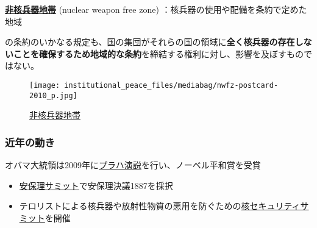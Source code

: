 \documentclass[
  xelatex,
  ja=standard]{bxjsarticle}
\providecommand{\tightlist}{%
  \setlength{\itemsep}{0pt}\setlength{\parskip}{0pt}}\usepackage{longtable,booktabs,array}
\begin{document}
\href{https://www.un.org/disarmament/wmd/nuclear/nwfz/}{\textbf{非核兵器地帯}}
(nuclear weapon free zone) ：核兵器の使用や配備を条約で定めた地域

\begin{tcolorbox}[enhanced jigsaw, opacityback=0, bottomtitle=1mm, arc=.35mm, opacitybacktitle=0.6, title=\textcolor{quarto-callout-note-color}{\faInfo}\hspace{0.5em}{\href{https://www1.doshisha.ac.jp/~karai/intlaw/docs/npt.htm}{核兵器不拡散条約}　第7条}, bottomrule=.15mm, coltitle=black, toptitle=1mm, titlerule=0mm, leftrule=.75mm, colframe=quarto-callout-note-color-frame, breakable, left=2mm, rightrule=.15mm, toprule=.15mm, colbacktitle=quarto-callout-note-color!10!white, colback=white]

の条約のいかなる規定も、国の集団がそれらの国の領域に\textbf{全く核兵器の存在しないことを確保するため地域的な条約}を締結する権利に対し、影響を及ぼすものではない。

\end{tcolorbox}

\begin{figure}[htpb]

{\centering \texttt{[image: institutional\_peace\_files/mediabag/nwfz-postcard-2010\_p.jpg]}

}

\caption{\href{https://www.un.org/nwfz/content/overview-nuclear-weapon-free-zones}{非核兵器地帯}}

\end{figure}

\hypertarget{ux8fd1ux5e74ux306eux52d5ux304d}{%
\subsubsection{近年の動き}\label{ux8fd1ux5e74ux306eux52d5ux304d}}

オバマ大統領は2009年に\href{https://ja.wikisource.org/wiki/\%E3\%83\%90\%E3\%83\%A9\%E3\%82\%AF\%E3\%83\%BB\%E3\%82\%AA\%E3\%83\%90\%E3\%83\%9E\%E3\%81\%AE\%E3\%83\%97\%E3\%83\%A9\%E3\%83\%8F\%E3\%81\%A7\%E3\%81\%AE\%E6\%BC\%94\%E8\%AA\%AC}{プラハ演説}を行い、ノーベル平和賞を受賞

\begin{itemize}
\tightlist
\item
  \href{https://www.mofa.go.jp/mofaj/gaiko/un_cd/gun_un/anpori_k09_gh.html}{安保理サミット}で安保理決議1887を採択
\item
  テロリストによる核兵器や放射性物質の悪用を防ぐための\href{https://www.mofa.go.jp/mofaj/gaiko/kaku_secu/index.html}{核セキュリティサミット}を開催
\end{itemize}
\end{document}
